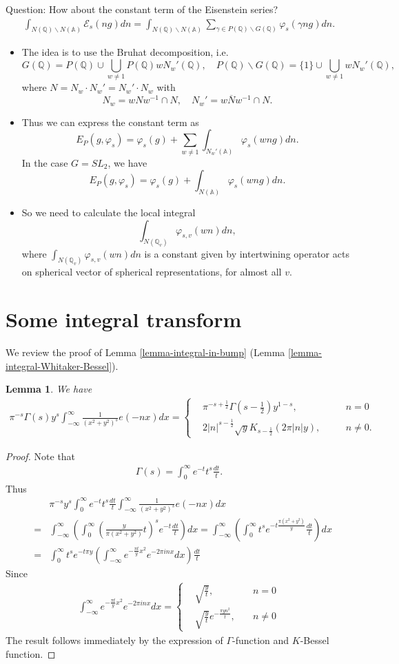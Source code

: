 \documentclass[11pt,reqno]{amsart}
\newcommand{\bna}{\begin{eqnarray*}}
\newcommand{\ena}{\end{eqnarray*}}
\def\A{\mathbb{A}}
\def\Q{\mathbb{Q}}
\newtheorem{lemma}{Lemma}[section]
\theoremstyle{definition}
\newcommand{\bit}{\begin{itemize}}
\newcommand{\eit}{\end{itemize}}
\begin{document}
Question: How about the constant term of the Eisenstein series?
\bna
\int_{N(\Q)\backslash N(\A)}\mathcal E_s(ng)dn=\int_{N(\Q)\backslash N(\A)}\sum_{\gamma\in P(\Q)\backslash G(\Q)}
\varphi_s(\gamma n g)dn.
\ena
\bit
\item
The idea is to use the Bruhat decomposition, i.e.
$$
G(\Q)=P(\Q)\cup \bigcup_{w\neq 1} P(\Q) w N_w'(\Q),\quad
P(\Q)\backslash G(\Q)=\{1\}\cup\bigcup_{w\neq 1} w N_w'(\Q),
$$
where $N=N_w\cdot N_w'=N_w'\cdot N_w$ with
$$
N_w= wNw^{-1}\cap N,\quad N_w'=w\overline {N} w^{-1}\cap N.
$$
\item Thus we can express the constant term as
$$
E_P(g,\varphi_s)=\varphi_s(g)+\sum_{w\neq 1}\int_{N_w'(\A)}\varphi_s(w ng)dn.
$$
In the case $G=SL_2$, we have
$$
E_P(g,\varphi_s)=\varphi_s(g)+\int_{N(\A)}\varphi_s(w ng)dn.
$$
\item
So we need to calculate the local integral
$$
\int_{N(\Q_v)}\varphi_{s,v}(w n)dn,
$$
where
$\int_{N(\Q_v)}\varphi_{s,v}(wn)dn$ is a constant given by intertwining operator acts
on spherical vector of spherical representations, for almost all $v$.
\eit


\section{Some integral transform}
We review the proof of Lemma \ref{lemma-integral-in-bump} (Lemma \ref{lemma-integral-Whitaker-Bessel}).
\begin{lemma}
We have
\bna
\pi^{-s}\Gamma(s)y^s\int_{-\infty}^\infty\frac{1}{(x^2+y^2)^s}e(-nx)dx
=\left\{
\begin{aligned}
&\pi^{-s+\frac{1}{2}}\Gamma(s-\frac{1}{2})y^{1-s},\quad && n=0\\
&2|n|^{s-\frac{1}{2}}\sqrt{y}K_{s-\frac{1}{2}}(2\pi|n|y),\quad &&n\neq 0.
\end{aligned}
\right.
\ena
\end{lemma}
\begin{proof}
Note that
\bna
\Gamma(s)=\int_0^\infty e^{-t}t^{s}\frac{dt}{t}.
\ena
Thus
\bna
&&\pi^{-s}y^s\int_{0}^\infty e^{-t}t^s\frac{dt}{t}
\int_{-\infty}^\infty\frac{1}{(x^2+y^2)^s}e(-nx)dx\\
&=&\int_{-\infty}^\infty\left(\int_0^\infty
\left(\frac{y}{\pi(x^2+y^2)}t\right)^{s} e^{-t}\frac{dt}{t}
\right)dx
=\int_{-\infty}^\infty\left(\int_0^\infty
t^{s} e^{-t\frac{\pi(x^2+y^2)}{y}}\frac{dt}{t}
\right)dx\\
&=&\int_0^\infty
t^{s} e^{-t\pi y}
\left(\int_{-\infty}^\infty
 e^{-\frac{\pi t}{y}x^2} e^{-2\pi i n x}dx\right)
 \frac{dt}{t}
\ena
Since
\bna
\int_{-\infty}^\infty
 e^{-\frac{\pi t}{y}x^2} e^{-2\pi i n x}dx=\left\{
 \begin{aligned}
 &\sqrt{\frac{y}{t}},\quad &n=0\\
 &\sqrt{\frac{y}{t}}e^{-\frac{\pi y n^2}{t}},\quad &n\neq 0
 \end{aligned}
 \right.
\ena
The result follows immediately by the expression of $\Gamma$-function and $K$-Bessel
function.
\end{proof}
\end{document}
